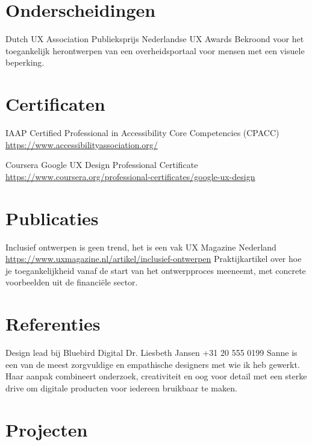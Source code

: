 \documentclass[a4paper, serif, 10pt]{moderncv}
\begin{document}
\section{Onderscheidingen}

        {Dutch UX Association}
        {Publieksprijs Nederlandse UX Awards}
        {}
        {}
        {Bekroond voor het toegankelijk herontwerpen van een overheidsportaal voor
mensen met een visuele beperking.}
\section{Certificaten}

        {IAAP}
        {Certified Professional in Accessibility Core Competencies (CPACC)}
        {\url{https://www.accessibilityassociation.org/}}
        {}
        {}

        {Coursera}
        {Google UX Design Professional Certificate}
        {\url{https://www.coursera.org/professional-certificates/google-ux-design}}
        {}
        {}
\section{Publicaties}

        {Inclusief ontwerpen is geen trend, het is een vak}
        {UX Magazine Nederland}
        {\url{https://www.uxmagazine.nl/artikel/inclusief-ontwerpen}}
        {}
        {Praktijkartikel over hoe je toegankelijkheid vanaf de start van het
ontwerpproces meeneemt, met concrete voorbeelden uit de financiële sector.}
\section{Referenties}

        {Design lead bij Bluebird Digital}
        {Dr. Liesbeth Jansen}
        {+31 20 555 0199}
        {}
        {Sanne is een van de meest zorgvuldige en empathische designers met wie ik
heb gewerkt. Haar aanpak combineert onderzoek, creativiteit en oog voor
detail met een sterke drive om digitale producten voor iedereen bruikbaar te maken.}
\section{Projecten}
\end{document}
